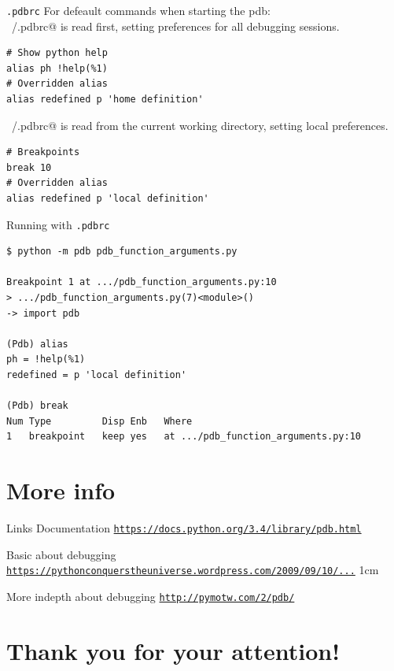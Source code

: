 \documentclass[
    size=20pt,
    style=sailor,
    display=slides,
    paper=smartboard,
    orient=landscape,
]{powerdot}
\begin{document}
\begin{slide}[method=file]{\texttt{.pdbrc}}
For defeault commands when starting the pdb:\\

\verb@~/.pdbrc@ is read first, setting preferences for all debugging 
sessions.
\begin{verbatim}
# Show python help
alias ph !help(%1)
# Overridden alias
alias redefined p 'home definition'
\end{verbatim}

\verb@~/.pdbrc@ is read from the current working directory, setting 
local preferences.

\begin{verbatim}
# Breakpoints
break 10
# Overridden alias
alias redefined p 'local definition'
\end{verbatim}
\end{slide}


\begin{slide}[method=file]{Running with \texttt{.pdbrc}}
\begin{verbatim}
$ python -m pdb pdb_function_arguments.py

Breakpoint 1 at .../pdb_function_arguments.py:10
> .../pdb_function_arguments.py(7)<module>()
-> import pdb

(Pdb) alias
ph = !help(%1)
redefined = p 'local definition'

(Pdb) break
Num Type         Disp Enb   Where
1   breakpoint   keep yes   at .../pdb_function_arguments.py:10
\end{verbatim}
\end{slide}


\section{More info}



\begin{slide}[method=file]{Links}
Documentation
\href{https://docs.python.org/3.4/library/pdb.html}{
\texttt{https://docs.python.org/3.4/library/pdb.html}}
\vspace{1cm}


Basic about debugging
\href{
https://pythonconquerstheuniverse.wordpress.com/2009/09/10/debugging-in-python/}
{\texttt{https://pythonconquerstheuniverse.wordpress.com/2009/09/10/...}}\vspace
{ 1cm}


More indepth about debugging
\href{http://pymotw.com/2/pdb/}{\texttt{http://pymotw.com/2/pdb/}}
\end{slide}



\section[template=wideslide,tocsection=hidden]{Thank you for your attention!}
\end{document}
